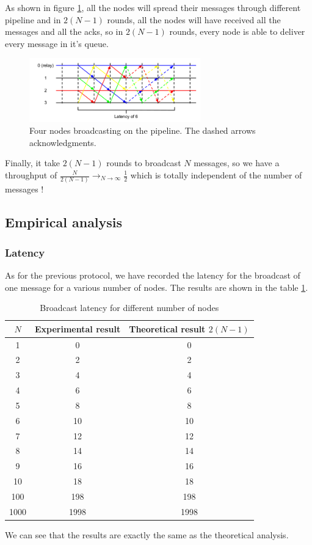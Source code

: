 \documentclass[a4paper]{article}
\begin{document}
As shown in figure \ref{figure:throughput2}, all the nodes will spread their
messages through different pipeline and in $2(N-1)$ rounds, all the
nodes will have received all the messages and all the acks, so in $2(N-1)$ rounds,
every node is able to deliver every message in it's queue.

\begin{figure}[h]
    \centering
    \includegraphics[width=280px]{Throughput2.png}
    \caption{Four nodes broadcasting on the pipeline. The dashed arrows
    acknowledgments.}
    \label{figure:throughput2}
\end{figure}

Finally, it take $2(N-1)$ rounds to broadcast $N$ messages, so we have a throughput
of $\frac{N}{2(N-1)}\longrightarrow_{N \rightarrow \infty}\frac{1}{2}$ which is totally independent of the number of
messages !
\subsection{Empirical analysis}

\subsubsection*{Latency}
As for the previous protocol, we have recorded the latency for the broadcast of
one message for a various number of nodes. The results are shown in the table
\ref{table:th}.
\begin{table}[H]
\centering
\begin{tabular}{|c|c|c|}
    \hline
    $N$  & Experimental result & Theoretical result $2(N-1)$ \\
    \hline
    1     & 0   & 0    \\
    2     & 2   & 2   \\
    3     & 4   & 4   \\
    4     & 6   & 6   \\
    5     & 8   & 8   \\
    6     & 10  & 10  \\
    7     & 12  & 12  \\
    8     & 14  & 14  \\
    9     & 16  & 16  \\
    10    & 18  & 18  \\
    100   & 198 & 198  \\
    1000  & 1998   & 1998  \\
    \hline
\end{tabular}
\caption{Broadcast latency for different number of nodes}
\label{table:th}
\end{table}
We can see that the results are exactly the same as the theoretical analysis.
\end{document}
